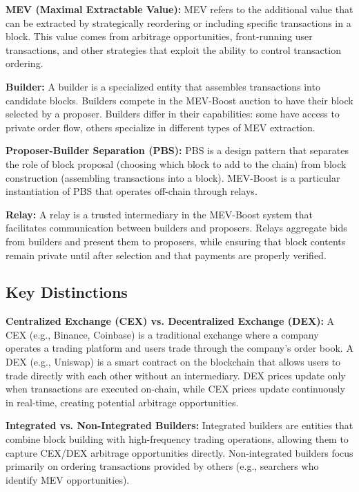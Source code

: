 \documentclass[12pt,reqno]{amsart}
\begin{document}
\textbf{MEV (Maximal Extractable Value):} MEV refers to the additional value that can be extracted by strategically reordering or including specific transactions in a block. This value comes from arbitrage opportunities, front-running user transactions, and other strategies that exploit the ability to control transaction ordering.

\textbf{Builder:} A builder is a specialized entity that assembles transactions into candidate blocks. Builders compete in the MEV-Boost auction to have their block selected by a proposer. Builders differ in their capabilities: some have access to private order flow, others specialize in different types of MEV extraction.

\textbf{Proposer-Builder Separation (PBS):} PBS is a design pattern that separates the role of block proposal (choosing which block to add to the chain) from block construction (assembling transactions into a block). MEV-Boost is a particular instantiation of PBS that operates off-chain through relays.

\textbf{Relay:} A relay is a trusted intermediary in the MEV-Boost system that facilitates communication between builders and proposers. Relays aggregate bids from builders and present them to proposers, while ensuring that block contents remain private until after selection and that payments are properly verified.

\subsection{Key Distinctions}

\textbf{Centralized Exchange (CEX) vs. Decentralized Exchange (DEX):} A CEX (e.g., Binance, Coinbase) is a traditional exchange where a company operates a trading platform and users trade through the company's order book. A DEX (e.g., Uniswap) is a smart contract on the blockchain that allows users to trade directly with each other without an intermediary. DEX prices update only when transactions are executed on-chain, while CEX prices update continuously in real-time, creating potential arbitrage opportunities.

\textbf{Integrated vs. Non-Integrated Builders:} Integrated builders are entities that combine block building with high-frequency trading operations, allowing them to capture CEX/DEX arbitrage opportunities directly. Non-integrated builders focus primarily on ordering transactions provided by others (e.g., searchers who identify MEV opportunities).
\end{document}
